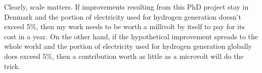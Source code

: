 Clearly, scale matters. If improvements resulting from this PhD project stay in Denmark and the portion of electricity used for hydrogen generation doesn't exceed 5\%, then my work needs to be worth a millivolt by itself to pay for its  cost in a year. On the other hand, if the hypothetical improvement spreads to the whole world and the portion of electricity used for hydrogen generation globally does exceed 5\%, then a contribution worth as little as a microvolt will do the trick.

